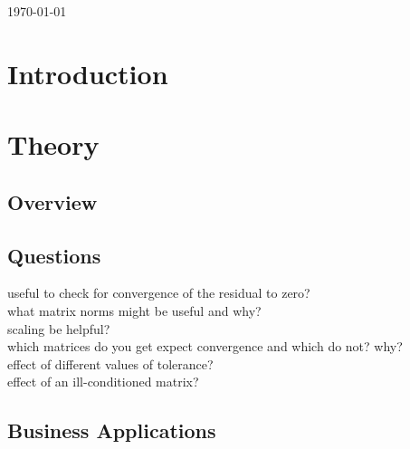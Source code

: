 \documentclass[paper=a4, fontsize=10pt]{scrartcl} %
\begin{document}
\begin{titlepage}

\vspace{3cm}
{\large \today}\\[1cm] %

\vfill %

\end{titlepage}

\tableofcontents
\clearpage
\onecolumn
\section{Introduction}
\clearpage
\section{Theory}

\subsection{Overview}

\subsection{Questions}
useful to check for convergence of the residual to zero?\\
what matrix norms might be useful and why?\\
scaling be helpful?\\
which matrices do you get expect convergence and which do not? why?\\
effect of different values of tolerance?\\
effect of an ill-conditioned matrix?\\

\subsection {Business Applications}
\end{document}
